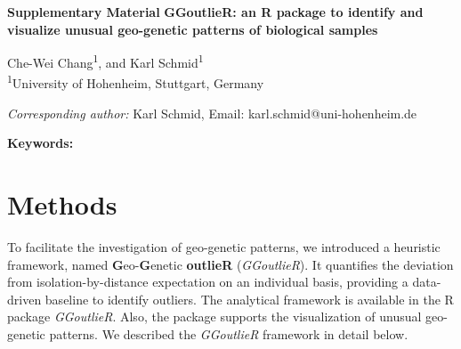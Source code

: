 \documentclass[11pt]{article}
\begin{document}
\begin{flushleft}
\textbf{Supplementary Material}
\textbf{GGoutlieR: an R package to identify and visualize unusual geo-genetic patterns of biological samples}

\vspace{2ex}

Che-Wei Chang\textsuperscript{1}, and Karl Schmid\textsuperscript{1}\\[1ex]

\textsuperscript{1}University of Hohenheim, Stuttgart, Germany\\


\vspace{2ex}

\textit{Corresponding author:} Karl Schmid, Email: karl.schmid@uni-hohenheim.de


\end{flushleft}

\newpage
\begin{abstract}
\small

\end{abstract}
\textbf{Keywords:} 

\newpage




\section*{Methods}

To facilitate the investigation of geo-genetic patterns, we introduced a heuristic framework, named \textbf{G}eo-\textbf{G}enetic \textbf{outlieR} (\textit{GGoutlieR}).
It quantifies the deviation from isolation-by-distance expectation on an individual basis, providing a data-driven baseline to identify outliers.
The analytical framework is available in the R package \textit{GGoutlieR}.
Also, the package supports the visualization of unusual geo-genetic patterns.
We described the \textit{GGoutlieR} framework in detail below.
\end{document}
